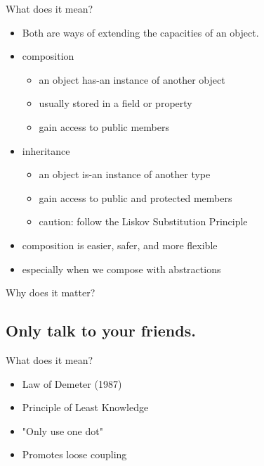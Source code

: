 \documentclass{beamer}
\begin{document}
\begin{frame}{What does it mean?}
    \begin{itemize}
        \item Both are ways of extending the capacities of an object.    
        \item composition
            \begin{itemize}
                \item an object has-an instance of another object
                \item usually stored in a field or property
                \item gain access to public members
            \end{itemize}
        \item inheritance
            \begin{itemize}
                \item an object is-an instance of another type
                \item gain access to public and protected members
                \item caution: follow the Liskov Substitution Principle
            \end{itemize}
        \item composition is easier, safer, and more flexible
        \item especially when we compose with abstractions 
    \end{itemize}
\end{frame}

\begin{frame}{Why does it matter?}
\end{frame}

\subsection{Only talk to your friends.}


\begin{frame}{What does it mean?}
    \begin{itemize}
        \item Law of Demeter (1987)
        \item Principle of Least Knowledge
        \item "Only use one dot"
        \item Promotes loose coupling
    \end{itemize}
\end{frame}
\end{document}
